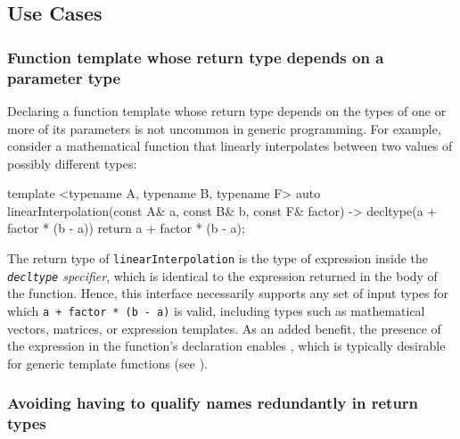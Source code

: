 \subsection[Use Cases]{Use Cases}\label{use-cases}

\subsubsection[Function template whose return type depends on a parameter type]{Function template whose return type depends on a parameter type}\label{function-template-whose-return-type-depends-on-a-parameter-type}

Declaring a function template whose return type depends on the types of
one or more of its parameters is not uncommon in generic programming.
For example, consider a mathematical function that linearly interpolates
between two values of possibly different types:

\begin{emcppslisting}
template <typename A, typename B, typename F>
auto linearInterpolation(const A& a, const B& b, const F& factor)
    -> decltype(a + factor * (b - a))
{
    return a + factor * (b - a);
}
\end{emcppslisting}

\noindent The return type of \lstinline!linearInterpolation! is the type of
expression inside the \emph{\lstinline!decltype! specifier}, which is
identical to the expression returned in the body of the function. Hence,
this interface necessarily supports any set of input types for which
\lstinline!a!~\lstinline!+!~\lstinline!factor!~\lstinline!*!~\lstinline!(b!~\lstinline!-!~\lstinline!a)!
is valid, including types such as mathematical vectors, matrices, or
expression templates. As an added benefit, the presence of the
expression in the function's declaration enables , which is typically desirable for generic template functions
(see %
).

\subsubsection[Avoiding having to qualify names redundantly in return types]{Avoiding having to qualify names redundantly in return types}\label{avoiding-having-to-qualify-names-redundantly-in-return-types}

